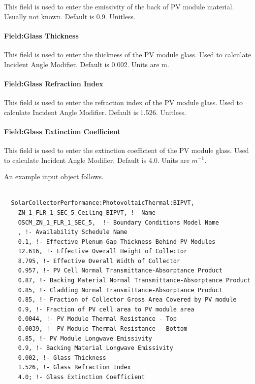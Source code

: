 This field is used to enter the emissivity of the back of PV module material. Usually not known. Default is 0.9. Unitless.

\paragraph{Field:Glass Thickness}\label{BIPVT-field-PVglass-thickness}

This field is used to enter the thickness of the PV module glass. Used to calculate Incident Angle Modifier. Default is 0.002. Units are m.

\paragraph{Field:Glass Refraction Index}\label{BIPVT-field-PVglass-refraction}

This field is used to enter the refraction index of the PV module glass. Used to calculate Incident Angle Modifier. Default is 1.526. Unitless.

\paragraph{Field:Glass Extinction Coefficient}\label{BIPVT-field-PVglass-extinction}

This field is used to enter the extinction coefficient of the PV module glass. Used to calculate Incident Angle Modifier. Default is 4.0. Units are \(m^{-1}\).


An example input object follows.


\begin{lstlisting}

  SolarCollectorPerformance:PhotovoltaicThermal:BIPVT,
    ZN_1_FLR_1_SEC_5_Ceiling_BIPVT, !- Name
    OSCM_ZN_1_FLR_1_SEC_5,  !- Boundary Conditions Model Name
    , !- Availability Schedule Name
    0.1, !- Effective Plenum Gap Thickness Behind PV Modules
    12.616, !- Effective Overall Height of Collector
    8.795, !- Effective Overall Width of Collector
    0.957, !- PV Cell Normal Transmittance-Absorptance Product
    0.87, !- Backing Material Normal Transmittance-Absorptance Product
    0.85, !- Cladding Normal Transmittance-Absorptance Product
    0.85, !- Fraction of Collector Gross Area Covered by PV module
    0.9, !- Fraction of PV cell area to PV module area
    0.0044, !- PV Module Thermal Resistance - Top
    0.0039, !- PV Module Thermal Resistance - Bottom
    0.85, !- PV Module Longwave Emissivity
    0.9, !- Backing Material Longwave Emissivity
    0.002, !- Glass Thickness
    1.526, !- Glass Refraction Index
    4.0; !- Glass Extinction Coefficient

\end{lstlisting}

